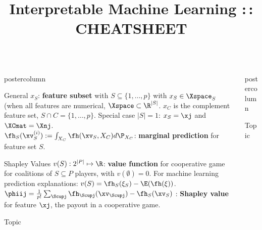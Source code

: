 \documentclass{beamer}
\title{Interpretable Machine Learning :\,: CHEATSHEET} %
\newlength{\columnheight} %
\begin{document}
\begin{frame}[fragile]{}
\vspace{-8ex}
\begin{columns}
	\begin{column}{.31\textwidth}
		\begin{beamercolorbox}[center]{postercolumn}
			\begin{minipage}{.98\textwidth}
				\parbox[t][\columnheight]{\textwidth}{
\begin{myblock}{General} \vspace{-2ex}
  $x_S$: \textbf{feature subset} with $S \subseteq \{1, \ldots, p\}$  with $x_S \in \Xspace_S$ (when all features are numerical, $\Xspace \subset \R^{|S|}$. $x_C$ is the complement feature set, $S \cap C = \{1, \ldots, p\}$. Special case $|S| = 1$: $x_S= \xj$ and $\XCmat = \Xnj$. \\

  $\fh_{S}(\xv_S^{(i)}) := \int_{X_C} \fh(\xv_S, X_C)d \P_{X_C}$: \textbf{marginal prediction} for feature set $S$. \\
\end{myblock}


\begin{myblock}{Shapley Values} \vspace{-2ex}
  $v(S): 2^{|P|} \mapsto \R$: \textbf{value function} for cooperative game for coalitions of $S \subseteq P$ players, with $v(\emptyset) = 0$. For machine learning prediction explanations: $v(S) =  \fh_{S} (\xi_S) - \E (\fh(\xi))$. \\

  $\phiij = \frac{1}{p!} \sum_{\Scupj} \fh_{\Scupj}(\xv_{\Scupj}) - \fh_{S}(\xv_{S})$ : \textbf{Shapley value} for feature $\xj$, the payout in a cooperative game. \\



\end{myblock}

\begin{myblock}{Topic} 

\end{myblock}
				}
			\end{minipage}
		\end{beamercolorbox}
	\end{column}
	\begin{column}{.31\textwidth}
		\begin{beamercolorbox}[center]{postercolumn}
			\begin{minipage}{.98\textwidth}
				\parbox[t][\columnheight]{\textwidth}{
\begin{myblock}{Topic} \vspace{-4ex}


\end{myblock}}
\end{minipage}
\end{beamercolorbox}
\end{column}
\end{columns}
\end{frame}
\end{document}
